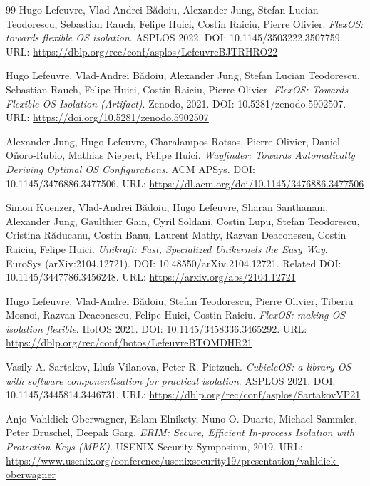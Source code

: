 \documentclass[UTF8,a4paper,12pt]{ctexart}
\numberwithin{equation}{section}
\begin{document}
\begin{thebibliography}{99}
\setlength{\itemsep}{0pt}
 Hugo Lefeuvre, Vlad-Andrei Bădoiu, Alexander Jung, Stefan Lucian
Teodorescu, Sebastian Rauch, Felipe Huici, Costin Raiciu, Pierre
Olivier. \emph{FlexOS: towards flexible OS isolation}. ASPLOS 2022. DOI:
10.1145/3503222.3507759. URL:
\url{https://dblp.org/rec/conf/asplos/LefeuvreBJTRHRO22}

 Hugo Lefeuvre, Vlad-Andrei Bădoiu, Alexander Jung, Stefan Lucian
Teodorescu, Sebastian Rauch, Felipe Huici, Costin Raiciu, Pierre
Olivier. \emph{FlexOS: Towards Flexible OS Isolation (Artifact)}.
Zenodo, 2021. DOI: 10.5281/zenodo.5902507. URL:
\url{https://doi.org/10.5281/zenodo.5902507}

 Alexander Jung, Hugo Lefeuvre, Charalampos Rotsos, Pierre
Olivier, Daniel Oñoro-Rubio, Mathias Niepert, Felipe Huici.
\emph{Wayfinder: Towards Automatically Deriving Optimal OS
Configurations}. ACM APSys. DOI:
10.1145/3476886.3477506. URL:
\url{https://dl.acm.org/doi/10.1145/3476886.3477506}

 Simon Kuenzer, Vlad-Andrei Bădoiu, Hugo Lefeuvre, Sharan
Santhanam, Alexander Jung, Gaulthier Gain, Cyril Soldani, Costin Lupu,
Stefan Teodorescu, Cristina Răducanu, Costin Banu, Laurent Mathy, Razvan
Deaconescu, Costin Raiciu, Felipe Huici. \emph{Unikraft: Fast,
Specialized Unikernels the Easy Way}. EuroSys
(arXiv:2104.12721). DOI: 10.48550/arXiv.2104.12721. Related DOI:
10.1145/3447786.3456248. URL: \url{https://arxiv.org/abs/2104.12721}

 Hugo Lefeuvre, Vlad-Andrei Bădoiu, Stefan Teodorescu, Pierre
Olivier, Tiberiu Mosnoi, Razvan Deaconescu, Felipe Huici, Costin Raiciu.
\emph{FlexOS: making OS isolation flexible}. HotOS 2021. DOI:
10.1145/3458336.3465292. URL:
\url{https://dblp.org/rec/conf/hotos/LefeuvreBTOMDHR21}

 Vasily A. Sartakov, Lluís Vilanova, Peter R. Pietzuch.
\emph{CubicleOS: a library OS with software componentisation for
practical isolation}. ASPLOS 2021. DOI: 10.1145/3445814.3446731. URL:
\url{https://dblp.org/rec/conf/asplos/SartakovVP21}

 Anjo Vahldiek-Oberwagner, Eslam Elnikety, Nuno O. Duarte,
Michael Sammler, Peter Druschel, Deepak Garg. \emph{ERIM: Secure,
Efficient In-process Isolation with Protection Keys (MPK)}. USENIX
Security Symposium, 2019. URL:
\url{https://www.usenix.org/conference/usenixsecurity19/presentation/vahldiek-oberwagner}


\end{thebibliography}
\end{document}
